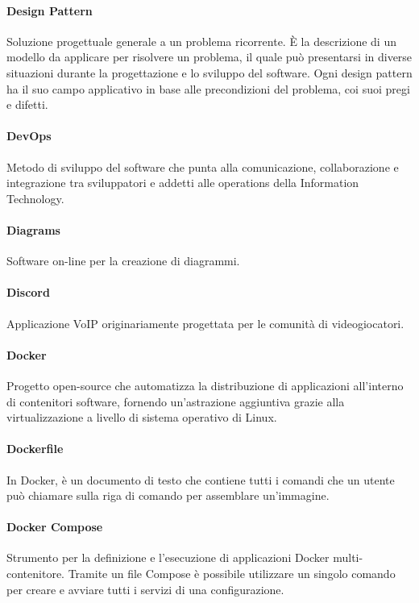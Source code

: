 \documentclass[]{article}
\begin{document}
	\paragraph*{Design Pattern}
	Soluzione progettuale generale a un problema ricorrente. È la descrizione di un modello da applicare per risolvere un problema, il quale può presentarsi in diverse situazioni durante la progettazione e lo sviluppo del software. Ogni design pattern ha il suo campo applicativo in base alle precondizioni del problema, coi suoi pregi e difetti.

	\paragraph*{DevOps}
	Metodo di sviluppo del software che punta alla comunicazione, collaborazione e integrazione tra sviluppatori e addetti alle operations della Information Technology.

	\paragraph*{Diagrams}
	Software on-line per la creazione di diagrammi.

	\paragraph*{Discord}
	Applicazione VoIP originariamente progettata per le comunità di videogiocatori.

	\paragraph*{Docker}
	Progetto open-source che automatizza la distribuzione di applicazioni all'interno di contenitori software, fornendo un'astrazione aggiuntiva grazie alla virtualizzazione a livello di sistema operativo di Linux.

	\paragraph*{Dockerfile}
	In Docker, è un documento di testo che contiene tutti i comandi che un utente può chiamare sulla riga di comando per assemblare un'immagine.

	\paragraph*{Docker Compose}
	Strumento per la definizione e l’esecuzione di applicazioni Docker multi-contenitore. Tramite un file Compose è possibile utilizzare un singolo comando per creare e avviare tutti i servizi di una configurazione.
\end{document}
